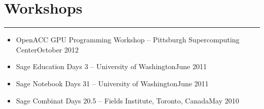 \documentclass[letterpaper,10pt]{article}
\newcommand{\mblue}{\color{darkblue}}
\begin{document}
\section*{\mblue Workshops}

\vspace{-2.15pc}
{\hfill\mblue\rule{5.76in}{0.02cm}}

\vspace{1pc}
\begin{itemize}
\item OpenACC GPU Programming Workshop -- Pittsburgh Supercomputing Center\qquad October 2012
\item Sage Education Days 3 -- University of Washington\qquad June 2011
\item Sage Notebook Days 31 -- University of Washington\qquad June 2011
\item Sage Combinat Days 20.5 -- Fields Institute, Toronto, Canada\qquad May 2010
\end{itemize}
\end{document}
